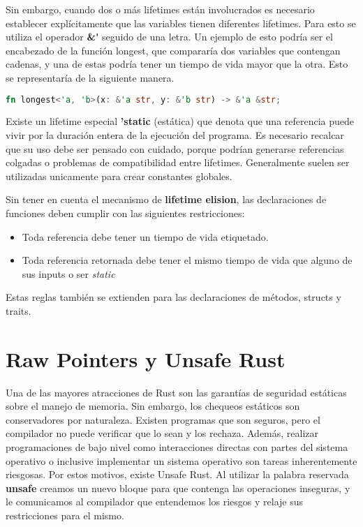 Sin embargo, cuando dos o más lifetimes están involucrados es necesario establecer explícitamente que las variables tienen diferentes lifetimes. Para esto se utiliza el operador \textbf{\&\'} seguido de una letra. Un ejemplo de esto podría ser el encabezado de la función longest, que compararía dos variables que contengan cadenas, y una de estas podría tener un tiempo de vida mayor que la otra. Esto se representaría de la siguiente manera.

\begin{lstlisting}[language=Rust]
    fn longest<'a, 'b>(x: &'a str, y: &'b str) -> &'a &str;
\end{lstlisting}

Existe un lifetime especial \textbf{'static} (estática) que denota que una referencia puede vivir por la duración entera de la ejecución del programa. Es necesario recalcar que su uso debe ser pensado con cuidado, porque podrían generarse referencias colgadas o problemas de compatibilidad entre lifetimes. Generalmente suelen ser utilizadas unicamente para crear constantes globales.

Sin tener en cuenta el mecanismo de \textbf{lifetime elision}, las declaraciones de funciones deben cumplir con las siguientes restricciones:
\begin{itemize}
    \item Toda referencia debe tener un tiempo de vida etiquetado.
    \item Toda referencia retornada debe tener el mismo tiempo de vida que alguno de sus inputs o ser \textit{static}
\end{itemize}
Estas reglas también se extienden para las declaraciones de métodos, structs y traits.

\section{Raw Pointers y Unsafe Rust}

Una de las mayores atracciones de Rust son las garantías de seguridad estáticas sobre el manejo de memoria. Sin embargo, los chequeos estáticos son conservadores por naturaleza. Existen programas que son seguros, pero el compilador no puede verificar que lo sean y los rechaza. Además, realizar programaciones de bajo nivel como interacciones directas con partes del sistema operativo o inclusive implementar un sistema operativo son tareas inherentemente riesgosas. Por estos motivos, existe Unsafe Rust. Al utilizar la palabra reservada \textbf{unsafe} creamos un nuevo bloque para que contenga las operaciones inseguras, y le comunicamos al compilador que entendemos los riesgos y relaje sus restricciones para el mismo.

